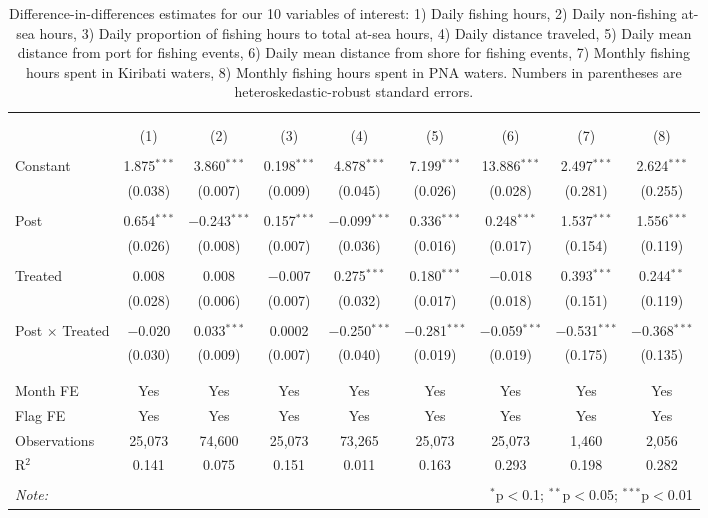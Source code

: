
\begin{table}[!htbp] \centering 
  \caption{\label{tab:main_DID}Difference-in-differences estimates for our 10 variables of interest: 1) Daily fishing hours, 2) Daily non-fishing at-sea hours, 3) Daily proportion of fishing hours to total at-sea hours, 4) Daily distance traveled, 5) Daily mean distance from port for fishing events, 6) Daily mean distance from shore for fishing events, 7) Monthly fishing hours spent in Kiribati waters, 8) Monthly fishing hours spent in PNA waters. Numbers in parentheses are heteroskedastic-robust standard errors.} 
  \label{} 
\footnotesize 
\begin{tabular}{@{\extracolsep{1pt}}lcccccccc} 
\\[-1.8ex]\hline 
\hline \\[-1.8ex] 
\\[-1.8ex] & (1) & (2) & (3) & (4) & (5) & (6) & (7) & (8)\\ 
\hline \\[-1.8ex] 
 Constant & 1.875$^{***}$ & 3.860$^{***}$ & 0.198$^{***}$ & 4.878$^{***}$ & 7.199$^{***}$ & 13.886$^{***}$ & 2.497$^{***}$ & 2.624$^{***}$ \\ 
  & (0.038) & (0.007) & (0.009) & (0.045) & (0.026) & (0.028) & (0.281) & (0.255) \\ 
  & & & & & & & & \\ 
 Post & 0.654$^{***}$ & $-$0.243$^{***}$ & 0.157$^{***}$ & $-$0.099$^{***}$ & 0.336$^{***}$ & 0.248$^{***}$ & 1.537$^{***}$ & 1.556$^{***}$ \\ 
  & (0.026) & (0.008) & (0.007) & (0.036) & (0.016) & (0.017) & (0.154) & (0.119) \\ 
  & & & & & & & & \\ 
 Treated & 0.008 & 0.008 & $-$0.007 & 0.275$^{***}$ & 0.180$^{***}$ & $-$0.018 & 0.393$^{***}$ & 0.244$^{**}$ \\ 
  & (0.028) & (0.006) & (0.007) & (0.032) & (0.017) & (0.018) & (0.151) & (0.119) \\ 
  & & & & & & & & \\ 
 Post $\times$ Treated & $-$0.020 & 0.033$^{***}$ & 0.0002 & $-$0.250$^{***}$ & $-$0.281$^{***}$ & $-$0.059$^{***}$ & $-$0.531$^{***}$ & $-$0.368$^{***}$ \\ 
  & (0.030) & (0.009) & (0.007) & (0.040) & (0.019) & (0.019) & (0.175) & (0.135) \\ 
  & & & & & & & & \\ 
\hline \\[-1.8ex] 
Month FE & Yes & Yes & Yes & Yes & Yes & Yes & Yes & Yes \\ 
Flag FE & Yes & Yes & Yes & Yes & Yes & Yes & Yes & Yes \\ 
Observations & 25,073 & 74,600 & 25,073 & 73,265 & 25,073 & 25,073 & 1,460 & 2,056 \\ 
R$^{2}$ & 0.141 & 0.075 & 0.151 & 0.011 & 0.163 & 0.293 & 0.198 & 0.282 \\ 
\hline 
\hline \\[-1.8ex] 
\textit{Note:}  & \multicolumn{8}{r}{$^{*}$p$<$0.1; $^{**}$p$<$0.05; $^{***}$p$<$0.01} \\ 
\end{tabular} 
\end{table} 
